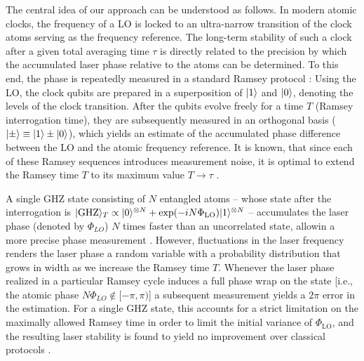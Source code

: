 The central idea of our approach can be understood as follows.
In modern atomic clocks, the frequency of a LO is locked to an ultra-narrow
 transition of the clock atoms serving as the
frequency reference.
The long-term stability  of such a clock after a given total averaging time
$\tau$ is directly related to the precision by which the accumulated laser phase
relative to the atoms can be determined. To this end, the phase is repeatedly
measured in a standard Ramsey protocol \cite{Ramsey1950}:
Using the LO, the clock qubits are prepared in a superposition of $| 1 \rangle$ and
$| 0 \rangle$, denoting the levels of the clock transition. After the qubits evolve
freely for a time $T$ (Ramsey interrogation time), they are subsequently
measured in an orthogonal basis ($| \pm \rangle \equiv | 1 \rangle \pm| 0 \rangle$), which
yields an estimate of the accumulated phase difference between the LO and the
atomic frequency reference.
It is known, that since each of these Ramsey sequences introduces measurement
noise, it is optimal to extend the Ramsey time $T$ 
to its maximum value $T\rightarrow\tau$ \cite{Braunstein:1992bx}.

A single GHZ state consisting of $N$ entangled atoms -- whose state after the
interrogation is $| \mathrm{GHZ} \rangle_T \propto | 0 \rangle^{\otimes N} + \mathrm{exp}(-i
N\Phi_{\mathrm{LO}}) | 1 \rangle^{\otimes N}$ -- accumulates the laser phase (denoted
by $\Phi_{LO}$) $N$ times faster than an uncorrelated state, allowin a more precise
phase measurement \cite{Giovanetti2011}. However, fluctuations in the
laser frequency renders the laser phase a
random variable with a probability distribution that grows in width as we
increase  the Ramsey time $T$.
Whenever the laser phase realized in a particular Ramsey cycle induces a full
phase wrap on the state [i.e., the atomic phase $N \Phi_{LO}\notin[-\pi,\pi)$]
a subsequent measurement yields a $2\pi$ error in the estimation. For a single GHZ
state, this accounts for a strict limitation on the maximally allowed Ramsey
time in order  to limit the initial variance of $\Phi_\mathrm{LO}$, and the resulting
laser stability is found to yield no improvement over classical protocols 
\cite{Wineland1998}.



